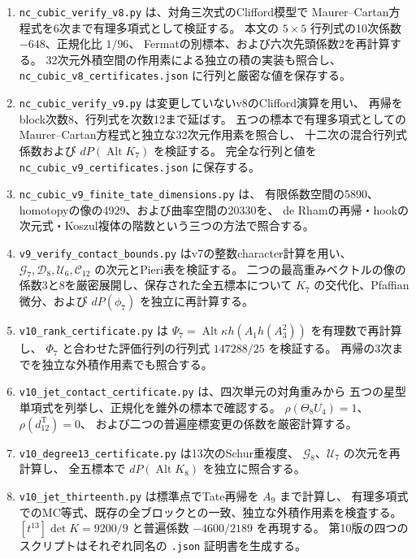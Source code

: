 \begin{enumerate}
 characterに適合する候補を選び、Reynolds投影によるJacobian像の階数2、
 Hessian候補を加えた階数3、および非所属を示す一つの単項式の係数を検証する。
 このコードは実際の境界の10次係数を決定するものではない。
 \item \texttt{nc\_cubic\_verify\_v8.py} は、対角三次式のClifford模型で
 Maurer--Cartan方程式を6次まで有理多項式として検証する。
 本文の $5\times5$ 行列式の10次係数 $-648$、正規化比 $1/96$、
 Fermatの別標本、および六次先頭係数2を再計算する。
 32次元外積空間の作用素による独立の積の実装も照合し、
 \texttt{nc\_cubic\_v8\_certificates.json} に行列と厳密な値を保存する。
 \item \texttt{nc\_cubic\_verify\_v9.py} は変更していないv8のClifford演算を用い、
 再帰をblock次数8、行列式を次数12まで延ばす。
 五つの標本で有理多項式としてのMaurer--Cartan方程式と独立な32次元作用素を照合し、
 十二次の混合行列式係数および $dP(\operatorname{Alt}K_7)$ を検証する。
 完全な行列と値を \texttt{nc\_cubic\_v9\_certificates.json} に保存する。
 \item \texttt{nc\_cubic\_v9\_finite\_tate\_dimensions.py} は、
 有限係数空間の5890、homotopyの像の4929、および曲率空間の20330を、
 de Rhamの再帰・hookの次元式・Koszul複体の階数という三つの方法で照合する。
 \item \texttt{v9\_verify\_contact\_bounds.py} はv7の整数character計算を用い、
 $\mathcal G_7,\mathcal D_8,\mathcal U_6,\mathcal C_{12}$ の次元とPieri表を検証する。
 二つの最高重みベクトルの像の係数3と8を厳密展開し、保存された全五標本について
 $K_7$ の交代化、Pfaffian微分、および $dP(\phi_7)$ を独立に再計算する。
 \item \texttt{v10\_rank\_certificate.py} は
 $\Psi_7=\operatorname{Alt}\kappa h(A_1h(A_3^2))$ を有理数で再計算し、
 $\Phi_7$ と合わせた評価行列の行列式 $147288/25$ を検証する。
 再帰の3次までを独立な外積作用素でも照合する。
 \item \texttt{v10\_jet\_contact\_certificate.py} は、四次単元の対角重みから
 五つの星型単項式を列挙し、正規化を錐外の標本で確認する。
 $\rho(\Theta_8U_4)=1$、$\rho(d^{\mathrm T}_{12})=0$、
 および二つの普遍座標変更の係数を厳密計算する。
 \item \texttt{v10\_degree13\_certificate.py} は13次のSchur重複度、
 $\mathcal G_8$、$\mathcal U_7$ の次元を再計算し、
 全五標本で $dP(\operatorname{Alt}K_8)$ を独立に照合する。
 \item \texttt{v10\_jet\_thirteenth.py} は標準点でTate再帰を $A_9$ まで計算し、
 有理多項式でのMC等式、既存の全ブロックとの一致、独立な外積作用素を検査する。
 $[t^{13}]\det K=9200/9$ と普遍係数 $-4600/2189$ を再現する。
 第10版の四つのスクリプトはそれぞれ同名の \texttt{.json} 証明書を生成する。


\end{enumerate}
